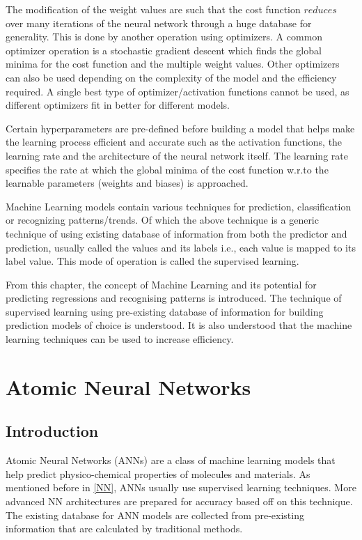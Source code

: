 \documentclass[11pt,a4paper]{report}
\begin{document}
{The modification of the weight values are such that the cost function $reduces$ over many iterations of the neural network through a huge database for generality. This is done by another operation using optimizers. A common optimizer operation is a stochastic gradient descent which finds the global minima for the cost function and the multiple weight values. Other optimizers can also be used depending on the complexity of the model and the efficiency required. A single best type of optimizer/activation functions cannot be used, as different optimizers fit in better for different models.

Certain hyperparameters are pre-defined before building a model that helps make the learning process efficient and accurate such as the activation functions, the learning rate and the architecture of the neural network itself. The learning rate specifies the rate at which the global minima of the cost function w.r.to the learnable parameters (weights and biases) is approached. 

Machine Learning models contain various techniques for prediction, classification or recognizing patterns/trends\cite{ML}. Of which the above technique is a generic technique of using existing database of information from both the predictor and prediction, usually called the values and its labels i.e., each value is mapped to its label value. This mode of operation is called the supervised learning.

From this chapter, the concept of Machine Learning and its potential for predicting regressions and recognising patterns is introduced. The technique of supervised learning using pre-existing database of information for building prediction models of choice is understood. It is also understood that the machine learning techniques can be used to increase efficiency.


\chapter{Atomic Neural Networks} \label{chap_ANN}
\section{Introduction} \label{ANN}
\large

Atomic Neural Networks (ANNs) are a class of machine learning models that help predict physico-chemical properties of molecules and materials. As mentioned before in \ref{NN}, ANNs usually use supervised learning techniques. More advanced NN architectures are prepared for accuracy based off on this technique. The existing database for ANN models are collected from pre-existing information that are calculated by traditional methods. 

}
\end{document}
